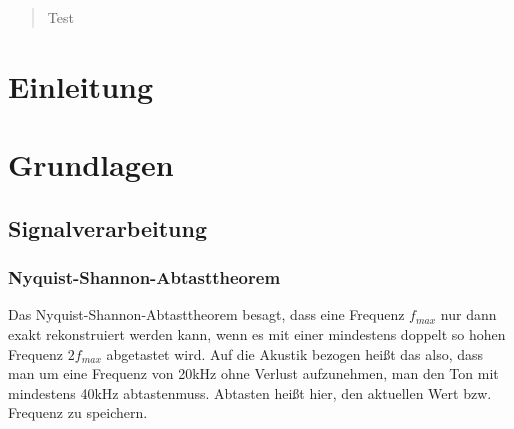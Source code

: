 \begin{abstract}
    Test
\end{abstract}



\chapter{Einleitung}

%



\chapter{Grundlagen}
\section{Signalverarbeitung}
\subsection{Nyquist-Shannon-Abtasttheorem}
\label{sec:Abtast}
Das Nyquist-Shannon-Abtasttheorem besagt, dass eine Frequenz $f_{max}$ nur dann exakt rekonstruiert werden kann, wenn es mit einer mindestens doppelt so hohen Frequenz $2f_{max}$ abgetastet wird. Auf die Akustik bezogen heißt das also, dass man um eine Frequenz von 20kHz ohne Verlust aufzunehmen, 
man den Ton mit mindestens 40kHz \glqq abtasten\grqq  muss. Abtasten heißt hier, den aktuellen Wert bzw. Frequenz zu speichern. 

